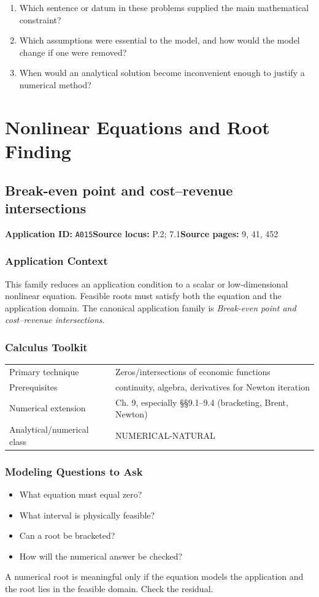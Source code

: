 \documentclass[11pt]{book}
\newcommand{\pid}[1]{\texttt{#1}}
\begin{document}
\begin{reflectionbox}\begin{enumerate}
\item Which sentence or datum in these problems supplied the main mathematical constraint?
\item Which assumptions were essential to the model, and how would the model change if one were removed?
\item When would an analytical solution become inconvenient enough to justify a numerical method?
\end{enumerate}\end{reflectionbox}
\part{Nonlinear Equations and Root Finding}
\chapter{Break-even point and cost–revenue intersections}\label{app:A015}
\textbf{Application ID:} \pid{A015}\quad \textbf{Source locus:} P.2; 7.1\quad \textbf{Source pages:} 9, 41, 452
\section*{Application Context}
This family reduces an application condition to a scalar or low-dimensional nonlinear equation. Feasible roots must satisfy both the equation and the application domain. The canonical application family is \emph{Break-even point and cost–revenue intersections}.
\section*{Calculus Toolkit}
\begin{tabularx}{\textwidth}{@{}lX@{}}\toprule
Primary technique & Zeros/intersections of economic functions \\
Prerequisites & continuity, algebra, derivatives for Newton iteration \\
Numerical extension & Ch. 9, especially §§9.1–9.4 (bracketing, Brent, Newton) \\
Analytical/numerical class & NUMERICAL-NATURAL \\
\bottomrule\end{tabularx}
\section*{Modeling Questions to Ask}\begin{itemize}
\item What equation must equal zero?
\item What interval is physically feasible?
\item Can a root be bracketed?
\item How will the numerical answer be checked?
\end{itemize}
\begin{errorbox}A numerical root is meaningful only if the equation models the application and the root lies in the feasible domain. Check the residual.\end{errorbox}
\end{document}
